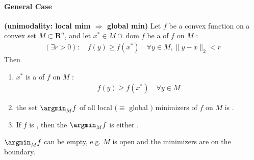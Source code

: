 \documentclass{article}
\newcommand{\bfs}[1]{\textbf{({#1}) }}
\newcommand{\dom}{\operatorname{dom}}
\begin{document}
\paragraph{General Case}
\begin{thma}\bfs{unimodality: local mim $\Rightarrow$ global min}\label{thm:loc_glo}
 Let $f$ be a convex function on a convex set $M \subset \mathbf{R}^{n}$, and let $x^{*} \in M \cap\dom f$ be a  of $f$ on $M$ :
\begin{align*}
(\exists r>0): \quad f(y) \geq f\left(x^{*}\right) \quad \forall y \in M,\|y-x\|_2<r
\end{align*}
Then 
\begin{enumerate}[1).]
    \item $x^{*}$ is a  of $f$ on $M$ :
\begin{align*}
f(y) \geq f\left(x^{*}\right) \quad \forall y \in M
\end{align*}
\item the set $\argmin_{M} f$ of all local $(\equiv$ global $)$ minimizers of $f$ on $M$ is .
\item If $f$ is , then the $\argmin_{M} f$ is either .
\end{enumerate} 
\end{thma}
\begin{rema}
$\argmin_{M} f$ can be empty, e.g. $M$ is open and the minimizers are on the boundary.
\end{rema}
\end{document}
